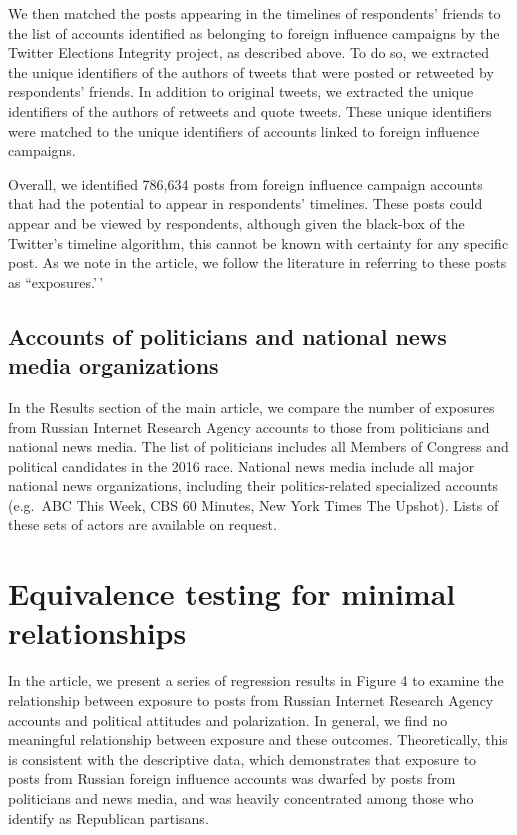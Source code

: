 \documentclass[
  12pt,
]{article}
\begin{document}
We then matched the posts appearing in the timelines of respondents' friends to the list of accounts identified as belonging to foreign influence campaigns by the Twitter Elections Integrity project, as described above. To do so, we extracted the unique identifiers of the authors of tweets that were posted or retweeted by respondents' friends. In addition to original tweets, we extracted the unique identifiers of the authors of retweets and quote tweets. These unique identifiers were matched to the unique identifiers of accounts linked to foreign influence campaigns.

Overall, we identified 786,634 posts from foreign influence campaign accounts that had the potential to appear in respondents' timelines. These posts could appear and be viewed by respondents, although given the black-box of the Twitter's timeline algorithm, this cannot be known with certainty for any specific post. As we note in the article, we follow the literature \citep[e.g.][]{Grinberg2019} in referring to these posts as ``exposures.'\,'

\hypertarget{accounts-of-politicians-and-national-news-media-organizations}{%
\subsection{Accounts of politicians and national news media organizations}\label{accounts-of-politicians-and-national-news-media-organizations}}

In the Results section of the main article, we compare the number of exposures from Russian Internet Research Agency accounts to those from politicians and national news media. The list of politicians includes all Members of Congress and political candidates in the 2016 race. National news media include all major national news organizations, including their politics-related specialized accounts (e.g.~ABC This Week, CBS 60 Minutes, New York Times The Upshot). Lists of these sets of actors are available on request.

\clearpage

\hypertarget{equivalence-testing-for-minimal-relationships}{%
\section{Equivalence testing for minimal relationships}\label{equivalence-testing-for-minimal-relationships}}

In the article, we present a series of regression results in Figure 4 to examine the relationship between exposure to posts from Russian Internet Research Agency accounts and political attitudes and polarization. In general, we find no meaningful relationship between exposure and these outcomes. Theoretically, this is consistent with the descriptive data, which demonstrates that exposure to posts from Russian foreign influence accounts was dwarfed by posts from politicians and news media, and was heavily concentrated among those who identify as Republican partisans.
\end{document}
